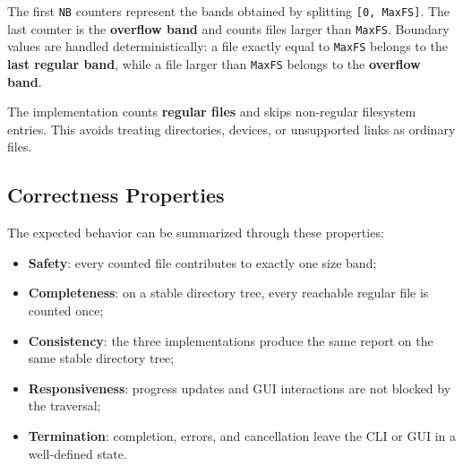 The first \texttt{NB} counters represent the bands obtained by splitting \texttt{[0, MaxFS]}.
The last counter is the \textbf{overflow band} and counts files larger than \texttt{MaxFS}.
Boundary values are handled deterministically: a file exactly equal to \texttt{MaxFS} belongs to the \textbf{last regular band}, while a file larger than \texttt{MaxFS} belongs to the \textbf{overflow band}.

The implementation counts \textbf{regular files} and skips non-regular filesystem entries.
This avoids treating directories, devices, or unsupported links as ordinary files.

\subsection{Correctness Properties}

The expected behavior can be summarized through these properties:

\begin{itemize}
  \item \textbf{Safety}: every counted file contributes to exactly one size band;
  \item \textbf{Completeness}: on a stable directory tree, every reachable regular file is counted once;
  \item \textbf{Consistency}: the three implementations produce the same report on the same stable directory tree;
  \item \textbf{Responsiveness}: progress updates and GUI interactions are not blocked by the traversal;
  \item \textbf{Termination}: completion, errors, and cancellation leave the CLI or GUI in a well-defined state.
\end{itemize}
